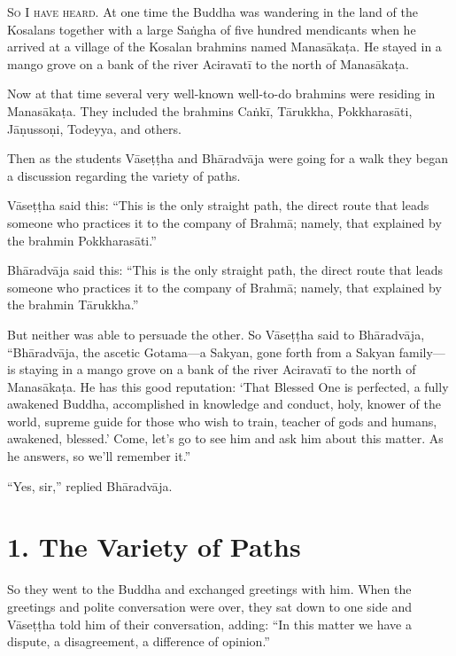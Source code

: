 \documentclass[12pt,openany]{book}%
\newcommand*{\scevam}[1]{\textsc{#1}}
\begin{document}
\scevam{So I have heard. }At one time the Buddha was wandering in the land of the Kosalans together with a large \textsanskrit{Saṅgha} of five hundred mendicants when he arrived at a village of the Kosalan brahmins named \textsanskrit{Manasākaṭa}. He stayed in a mango grove on a bank of the river \textsanskrit{Aciravatī} to the north of \textsanskrit{Manasākaṭa}. 

Now at that time several very well-known well-to-do brahmins were residing in \textsanskrit{Manasākaṭa}. They included the brahmins \textsanskrit{Caṅkī}, \textsanskrit{Tārukkha}, \textsanskrit{Pokkharasāti}, \textsanskrit{Jāṇussoṇi}, Todeyya, and others. 

Then as the students \textsanskrit{Vāseṭṭha} and \textsanskrit{Bhāradvāja} were going for a walk they began a discussion regarding the variety of paths. 

\textsanskrit{Vāseṭṭha} said this: “This is the only straight path, the direct route that leads someone who practices it to the company of \textsanskrit{Brahmā}; namely, that explained by the brahmin \textsanskrit{Pokkharasāti}.” 

\textsanskrit{Bhāradvāja} said this: “This is the only straight path, the direct route that leads someone who practices it to the company of \textsanskrit{Brahmā}; namely, that explained by the brahmin \textsanskrit{Tārukkha}.” 

But neither was able to persuade the other. So \textsanskrit{Vāseṭṭha} said to \textsanskrit{Bhāradvāja}, “\textsanskrit{Bhāradvāja}, the ascetic Gotama—a Sakyan, gone forth from a Sakyan family—is staying in a mango grove on a bank of the river \textsanskrit{Aciravatī} to the north of \textsanskrit{Manasākaṭa}. He has this good reputation: ‘That Blessed One is perfected, a fully awakened Buddha, accomplished in knowledge and conduct, holy, knower of the world, supreme guide for those who wish to train, teacher of gods and humans, awakened, blessed.’ Come, let’s go to see him and ask him about this matter. As he answers, so we’ll remember it.” 

“Yes, sir,” replied \textsanskrit{Bhāradvāja}. 

\section*{1. The Variety of Paths }

So they went to the Buddha and exchanged greetings with him. When the greetings and polite conversation were over, they sat down to one side and \textsanskrit{Vāseṭṭha} told him of their conversation, adding: “In this matter we have a dispute, a disagreement, a difference of opinion.” 
\end{document}
